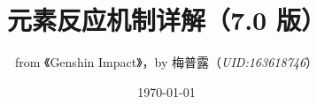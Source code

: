 




\title{元素反应机制详解（7.0 版）}
\author{from 《Genshin Impact》，by 梅普露（\textit{UID:163618746}）}
\date{\today}
\maketitle

\tableofcontents

\newpage









